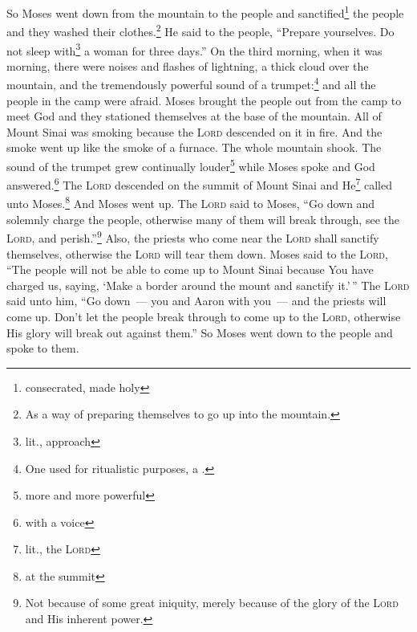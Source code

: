 \begin{enumerate*}[mode=unboxed]
     So Moses went down from the mountain to the people and sanctified\footnote{consecrated, made holy} the people and they washed their clothes.\footnote{As a way of preparing themselves to go up into the mountain.}%
     He said to the people, ``Prepare yourselves. Do not sleep with\footnote{lit., approach} a woman for three days.''%
     On the third morning, when it was morning, there were noises and flashes of lightning, a thick cloud over the mountain, and the tremendously powerful sound of a trumpet:\footnote{One used for ritualistic purposes, a .} and all the people in the camp were afraid.%
     Moses brought the people out from the camp to meet God and they stationed themselves at the base of the mountain.%
     All of Mount Sinai was smoking because the \textsc{Lord} descended on it in fire. And the smoke went up like the smoke of a furnace. The whole mountain shook.%
     The sound of the trumpet grew continually louder\footnote{more and more powerful} while Moses spoke and God answered.\footnote{with a voice}%
     The \textsc{Lord} descended on the summit of Mount Sinai and He\footnote{lit., the \textsc{Lord}} called unto Moses.\footnote{at the summit} And Moses went up.%
     The \textsc{Lord} said to Moses, ``Go down and solemnly charge the people, otherwise many of them will break through, see the \textsc{Lord}, and perish.''\footnote{Not because of some great iniquity, merely because of the glory of the \textsc{Lord} and His inherent power.}%
     Also, the priests who come near the \textsc{Lord} shall sanctify themselves, otherwise the \textsc{Lord} will tear them down.%
     Moses said to the \textsc{Lord}, ``The people will not be able to come up to Mount Sinai because You have charged us, saying, `Make a border around the mount and sanctify it.'\,''%
     The \textsc{Lord} said unto him, ``Go down~--- you and Aaron with you~--- and the priests will come up. Don't let the people break through to come up to the \textsc{Lord}, otherwise His glory will break out against them.''%
     So Moses went down to the people and spoke to them.%
\end{enumerate*}
